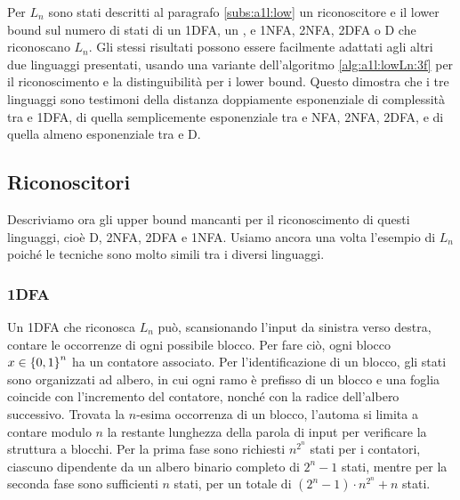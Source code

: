 Per $L_n$ sono stati descritti al paragrafo \ref{subs:a1l:low} un  riconoscitore e il lower bound sul numero di stati di un 1DFA, un , e 1NFA, 2NFA, 2DFA o D che riconoscano $L_n$. Gli stessi risultati possono essere facilmente adattati agli altri due linguaggi presentati, usando una variante dell'algoritmo \ref{alg:a1l:lowLn:3f} per il riconoscimento e la distinguibilità per i lower bound. Questo dimostra che i tre linguaggi sono testimoni della distanza doppiamente esponenziale di complessità tra  e 1DFA, di quella semplicemente esponenziale tra  e NFA, 2NFA, 2DFA, e di quella almeno esponenziale tra  e D.


\subsection{Riconoscitori}
Descriviamo ora gli upper bound mancanti per il riconoscimento di questi linguaggi, cioè D, 2NFA, 2DFA e 1NFA. Usiamo ancora una volta l'esempio di $L_n$ poiché le tecniche sono molto simili tra i diversi linguaggi.

\subsubsection{1DFA}
Un 1DFA che riconosca $L_n$ può, scansionando l'input da sinistra verso destra, contare le occorrenze di ogni possibile blocco. Per fare ciò, ogni blocco $x\in\left\{ 0,1 \right\}^n$ ha un contatore associato. Per l'identificazione di un blocco, gli stati sono organizzati ad albero, in cui ogni ramo è prefisso di un blocco e una foglia coincide con l'incremento del contatore, nonché con la radice dell'albero successivo. Trovata la $n$-esima occorrenza di un blocco, l'automa si limita a contare modulo $n$ la restante lunghezza della parola di input per verificare la struttura a blocchi. Per la prima fase sono richiesti $n^{2^n}$ stati per i contatori, ciascuno dipendente da un albero binario completo di $2^n-1$ stati, mentre per la seconda fase sono sufficienti $n$ stati, per un totale di $(2^n-1)\cdot n^{2^n}+n$ stati.

